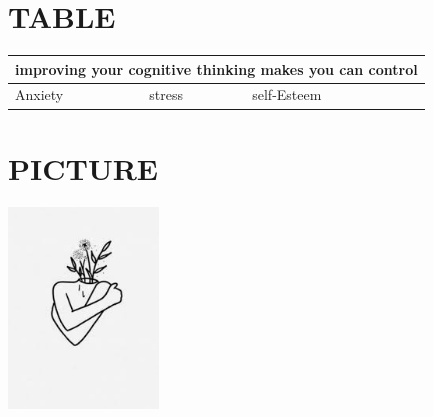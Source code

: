\documentclass[12pt]{article}
\begin{document}
\section{TABLE}
\setlength{\arrayrulewidth}{1mm}
\setlength{\tabcolsep}{18pt}
\renewcommand{\arraystretch}{1.5}
\begin{tabular}{ |p{3cm}|p{3cm}|p{3cm}| }
\hline
\multicolumn{3}{|c|}{\bf{improving your cognitive thinking makes you can control}} \\
\hline
Anxiety& stress &self-Esteem\\
\hline
\end{tabular}
\newpage
\section{PICTURE}

\centering
\includegraphics[width=4cm]{selfLove.jpg}
\end{document}
